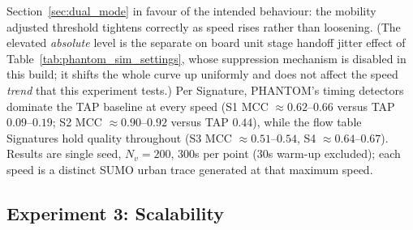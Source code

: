 \documentclass[final,5p,twocolumn]{elsarticle}
\theoremstyle{remark}
\theoremstyle{plain}
\begin{document}
Section~\ref{sec:dual_mode} in favour of the intended behaviour: the mobility
adjusted threshold tightens correctly as speed rises rather than loosening. (The
elevated \emph{absolute} level is the separate on board unit stage handoff
jitter effect of Table~\ref{tab:phantom_sim_settings}, whose suppression
mechanism is disabled in this build; it shifts the whole curve up uniformly and
does not affect the speed \emph{trend} that this experiment tests.) Per
Signature, PHANTOM's timing detectors dominate the TAP baseline at every speed
(S1 MCC $\approx0.62$--$0.66$ versus TAP $0.09$--$0.19$; S2 MCC
$\approx0.90$--$0.92$ versus TAP $0.44$), while the flow table Signatures hold
quality throughout (S3 MCC $\approx0.51$--$0.54$, S4 $\approx0.64$--$0.67$).
Results are single seed, $N_v{=}200$,
$300$s per point ($30$s warm-up excluded); each speed is a distinct SUMO urban
trace generated at that maximum speed.

\subsection{Experiment 3: Scalability}
\end{document}
